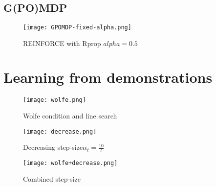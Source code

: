 \documentclass[]{article}
\begin{document}
\subsection{G(PO)MDP}
\begin{figure}[!htb]
	\centering
	\texttt{[image: GPOMDP-fixed-alpha.png]}
	\caption{\label{fig:GPOMDP-fixed-alpha}REINFORCE with Rprop $alpha=0.5$}
\end{figure}

\section{Learning from demonstrations}
\paragraph{} 
\begin{figure}
	\centering
	\texttt{[image: wolfe.png]}
	\caption{\label{fig:LfD-}Wolfe condition and line search}
\end{figure}
\begin{figure}
	\centering
	\texttt{[image: decrease.png]}
	\caption{\label{fig:decrease}Decreasing step-size$\alpha_t=\frac{10}{t}$}
\end{figure}
\begin{figure}
	\centering
	\texttt{[image: wolfe+decrease.png]}
	\caption{\label{fig:wolfe+decrease}Combined step-size}
\end{figure}
\end{document}
